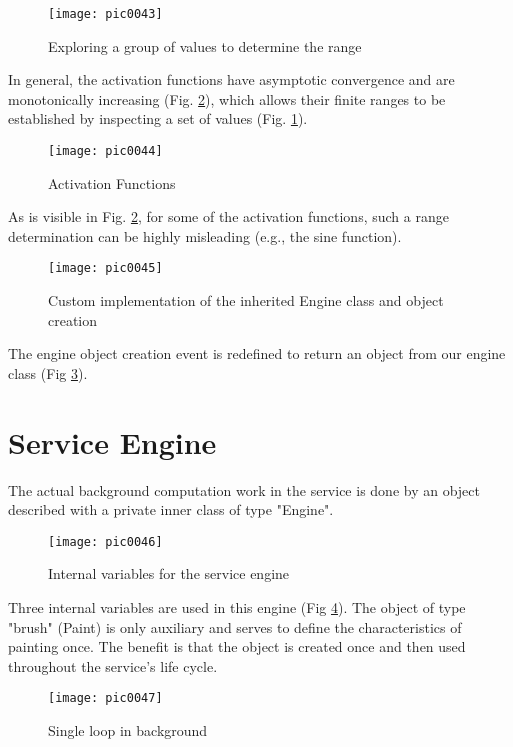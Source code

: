 \begin{figure}[h]
\centering
\texttt{[image: pic0043]}
\caption{Exploring a group of values to determine the range}
\label{fig:pic0043}
\end{figure}
\FloatBarrier

In general, the activation functions have asymptotic convergence and are monotonically increasing (Fig. \ref{fig:pic0044}), which allows their finite ranges to be established by inspecting a set of values (Fig. \ref{fig:pic0043}).

\begin{figure}[h]
\centering
\texttt{[image: pic0044]}
\caption{Activation Functions \cite{afwiki}}
\label{fig:pic0044}
\end{figure}
\FloatBarrier

As is visible in Fig. \ref{fig:pic0044}, for some of the activation functions, such a range determination can be highly misleading (e.g., the sine function).

\begin{figure}[h]
\centering
\texttt{[image: pic0045]}
\caption{Custom implementation of the inherited Engine class and object creation}
\label{fig:pic0045}
\end{figure}
\FloatBarrier

The engine object creation event is redefined to return an object from our engine class (Fig \ref{fig:pic0045}).

\section{Service Engine}

The actual background computation work in the service is done by an object described with a private inner class of type "Engine".

\begin{figure}[h]
\centering
\texttt{[image: pic0046]}
\caption{Internal variables for the service engine}
\label{fig:pic0046}
\end{figure}
\FloatBarrier

Three internal variables are used in this engine (Fig \ref{fig:pic0046}). The object of type "brush" (Paint) is only auxiliary and serves to define the characteristics of painting once. The benefit is that the object is created once and then used throughout the service's life cycle.

\begin{figure}[h]
\centering
\texttt{[image: pic0047]}
\caption{Single loop in background}
\label{fig:pic0047}
\end{figure}
\FloatBarrier


